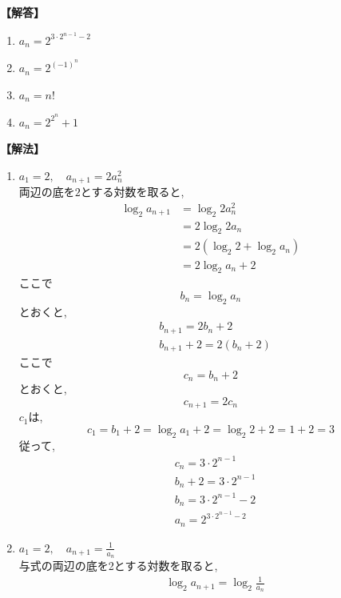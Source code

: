     \noindent\textbf{【解答】}
    \begin{enumerate}[label=(\arabic*),parsep=3pt]
      \item $\displaystyle a_n=2^{3\cdot2^{n-1}-2}$
      \item $a_n=2^{(-1)^{n}}$
      \item $a_n=n!$
      \item $a_n=2^{2^n}+1$
    \end{enumerate}

    \noindent\textbf{【解法】}
    \begin{enumerate}[label=(\arabic*),parsep=3pt]
      \item $\displaystyle a_1=2,\quad a_{n+1}=2a_n^2$\\
            両辺の底を$2$とする対数を取ると,
            \begin{align*}
              \log_2a_{n+1}
                &=\log_2{2a_n^2}\\
                &=2\log_2{2a_n}\\
                &=2(\log_2{2}+\log_2{a_n})\\
                &=2\log_2{a_n}+2
            \end{align*}
            ここで
            \[
              b_n=\log_2a_n
            \]
            とおくと,
            \begin{align*}
              &b_{n+1}=2b_n+2\\
              &b_{n+1}+2=2(b_n+2)
            \end{align*}
            ここで
            \[
              c_n=b_n+2
            \]
            とおくと,
            \[
              c_{n+1}=2c_n
            \]
            $c_1$は,
            \[
              c_1=b_1+2=\log_2{a_1}+2=\log_2{2}+2=1+2=3
            \]
            従って,
            \begin{align*}
              &c_n=3\cdot2^{n-1}\\
              &b_n+2=3\cdot2^{n-1}\\
              &b_n=3\cdot2^{n-1}-2\\
              &a_n=2^{3\cdot2^{n-1}-2}
            \end{align*}
      \item $\displaystyle a_1=2,\quad a_{n+1}=\frac{1}{a_n}$\\
            与式の両辺の底を2とする対数を取ると,
            \begin{align*}
              &\log_2{a_{n+1}}=\log_2{\frac{1}{a_n}}\\

\end{align*}
\end{enumerate}
